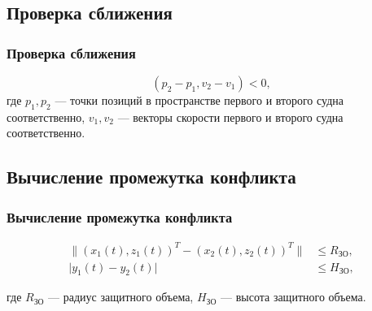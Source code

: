 \documentclass[10pt,t]{beamer}
\begin{document}
\subsection[Проверка сближения]{Проверка сближения}
\begin{frame}
\frametitle{Проверка сближения}
\small

\begin{center}
\end{center}  

$$(p_2 - p_1, v_2 - v_1 ) < 0,$$
где $p_1, p_2$ --- точки позиций в пространстве первого и второго судна соответственно, 
$v_1, v_2$ --- векторы скорости первого и второго судна соответственно.

\end{frame}

\subsection[Вычисление промежутка конфликта]{Вычисление промежутка конфликта}
\begin{frame}
\frametitle{Вычисление промежутка конфликта}
\small

\begin{align*}
    \big\|(x_1(t), z_1(t))^T - (x_2(t), z_2(t))^T\big\| &\leqslant R_\text{ЗО},\\
    \big|y_1(t) - y_2(t)\big| &\leqslant H_\text{ЗО},
\end{align*}

где $R_\text{ЗО}$ --- радиус защитного объема, $H_\text{ЗО}$ --- высота защитного объема. 

\end{frame}
\end{document}
